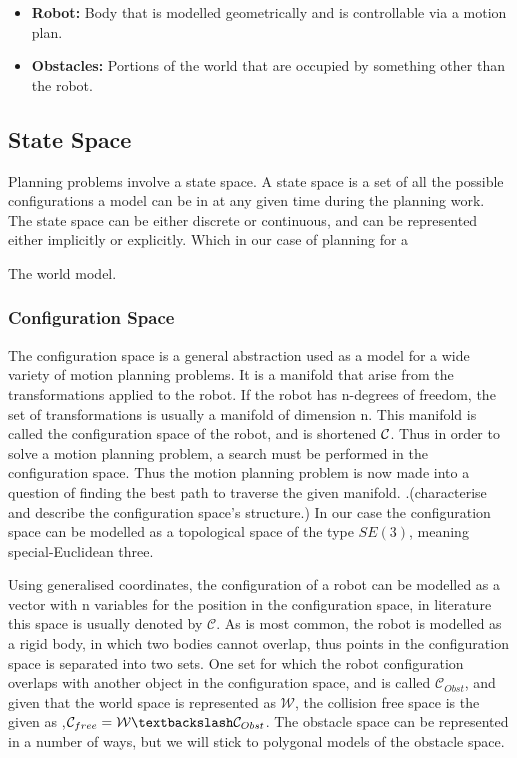 \begin{itemize}
\item \textbf{Robot:} Body that is modelled geometrically and is controllable via
  a motion plan.
\item \textbf{Obstacles:} Portions of the world that are occupied by something
  other than the robot.
\end{itemize}
\subsection{State Space}
\label{subsec:State}
Planning problems involve a state space. A state space is a set of all the
possible configurations a model can be in at any given time during the planning
work. The state space can be either discrete or continuous, and can be
represented either implicitly or explicitly. Which in our case of planning for a

The world model.

\subsubsection{Configuration Space}
\label{sec:configuration-space}
The configuration space is a general abstraction used as a model for a wide
variety of motion planning problems. It is a manifold that arise from the
transformations applied to the robot. If the robot has n-degrees of freedom, the
set of transformations is usually a manifold of dimension n. This manifold is
called the configuration space of the robot, and is shortened \(\\\mathcal{C}\).
Thus in order to solve a motion planning problem, a search must be performed in
the configuration space. Thus the motion planning problem is now made into a
question of finding the best path to traverse the given manifold. \cite{Lav06}.(characterise and describe the
configuration space's structure.)
In our case the configuration space can be modelled as a topological space of
the type \(SE(3)\), meaning special-Euclidean three.

Using generalised coordinates, the configuration of a robot can be modelled as a
vector with n variables for the position in the configuration space, in
literature this space is usually denoted by \(\mathcal{C}\). As is most common,
the robot is modelled as a rigid body, in which two bodies cannot overlap, thus
points in the configuration space is separated into two sets. One set for which
the robot configuration overlaps with another object in the configuration space,
and is called \(\mathcal{C}_{Obst}\), and given that the world space is
represented as \(\mathcal{W}\), the collision free space is the given as
,\(\mathcal{C}_{free} = \mathcal{W}\textbackslash \mathcal{C}_{Obst}\). The
obstacle space can be represented in a number of ways, but we will stick to
polygonal models of the obstacle space.

